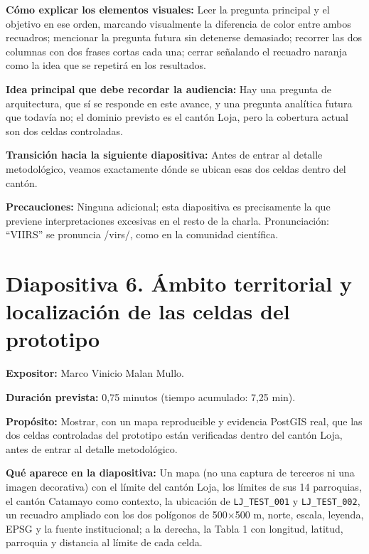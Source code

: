 \documentclass[11pt,a4paper]{article}
\newcommand{\campo}[2]{\par\medskip\noindent\textbf{#1:} #2\par}
\newcommand{\separadordiapositiva}{\bigskip\noindent{\color{Tierra!60}\hrulefill}\bigskip}
\begin{document}
\campo{C\'omo explicar los elementos visuales}{Leer la pregunta
principal y el objetivo en ese orden, marcando visualmente la
diferencia de color entre ambos recuadros; mencionar la pregunta
futura sin detenerse demasiado; recorrer las dos columnas con dos
frases cortas cada una; cerrar se\~nalando el recuadro naranja como la
idea que se repetir\'a en los resultados.}
\campo{Idea principal que debe recordar la audiencia}{Hay una pregunta
de arquitectura, que s\'i se responde en este avance, y una pregunta
anal\'itica futura que todav\'ia no; el dominio previsto es el cant\'on
Loja, pero la cobertura actual son dos celdas controladas.}
\campo{Transici\'on hacia la siguiente diapositiva}{Antes de entrar al
detalle metodol\'ogico, veamos exactamente d\'onde se ubican esas dos
celdas dentro del cant\'on.}
\campo{Precauciones}{Ninguna adicional; esta diapositiva es
precisamente la que previene interpretaciones excesivas en el resto de
la charla. Pronunciaci\'on: ``VIIRS'' se pronuncia /virs/, como en la
comunidad cient\'ifica.}

\separadordiapositiva

\section*{Diapositiva 6. \'Ambito territorial y localizaci\'on de las celdas del prototipo}

\campo{Expositor}{Marco Vinicio Malan Mullo.}
\campo{Duraci\'on prevista}{0,75 minutos (tiempo acumulado: 7,25 min).}
\campo{Prop\'osito}{Mostrar, con un mapa reproducible y evidencia
PostGIS real, que las dos celdas controladas del prototipo est\'an
verificadas dentro del cant\'on Loja, antes de entrar al detalle
metodol\'ogico.}
\campo{Qu\'e aparece en la diapositiva}{Un mapa (no una captura de
terceros ni una imagen decorativa) con el l\'imite del cant\'on Loja,
los l\'imites de sus 14 parroquias, el cant\'on Catamayo como
contexto, la ubicaci\'on de \texttt{LJ\_TEST\_001} y
\texttt{LJ\_TEST\_002}, un recuadro ampliado con los dos pol\'igonos
de 500$\times$500 m, norte, escala, leyenda, EPSG y la fuente
institucional; a la derecha, la Tabla 1 con longitud, latitud,
parroquia y distancia al l\'imite de cada celda.}
\end{document}
